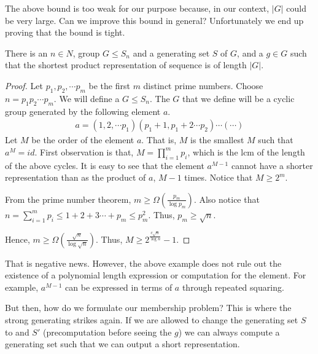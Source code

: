 The above bound is too weak for our purpose because, in our context, $|G|$ could be very large. Can we improve this bound in general?
Unfortunately we end up proving that the bound is tight.

\begin{proposition}
There is an $n \in N$, group $G \le S_n$ and a generating set $S$ of $G$, and a $g \in G$ such that the shortest product representation of 
sequence is of length $|G|$. \label{prop:repr-large}
\end{proposition}
\begin{proof}
Let $p_1, p_2, \cdots p_m$ be the first $m$ distinct prime numbers.
Choose $n = p_1p_2 \cdots p_m$. We will define a $G \le S_n$. The $G$ that we define will be a cyclic group generated by the following element $a$.
\begin{align}
a = (1, 2, \cdots p_1) (p_1+1, p_1+2 \cdots p_2) \cdots (\cdots)
\end{align}
Let $M$ be the order of the element $a$. That is, $M$ is the smallest $M$ such that $a^M = id$. First observation is that, $M = \prod\limits_{i=1}^m p_i$, which is the lcm of the length of the above cycles. It is easy to see that the element $a^{M-1}$ cannot have a shorter representation than as the product of $a$, $M-1$ times. Notice that $M \ge 2^m$.

From the prime number theorem, $m \geq \Omega(\frac{p_m}{\log p_m})$.
Also notice that $n = \sum\limits_{i = 1}^m p_i \leq 1 + 2 + 3 \cdots + p_m \leq p_m^2$. Thus, $p_m \geq \sqrt n$.

Hence, $m \geq \Omega(\frac{\sqrt n}{\log \sqrt n})$. Thus, $M \geq 2^{\frac{c \sqrt n}{\log n }} - 1$.
\end{proof}

That is negative news. However, the above example does not rule out the existence of a polynomial length expression or computation for the element. For example, $a^{M-1}$ can be expressed in terms of
$a$ through repeated squaring.

But then, how do we formulate our membership problem? This is where the strong generating strikes again. If we are allowed to change the generating set $S$ to and $S'$ (precomputation before seeing the $g$) we can always compute a generating set such that we can output a short representation. 


